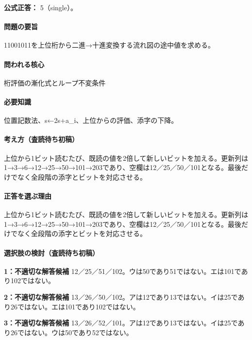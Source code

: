 \textbf{公式正答：} 5（single）。

\paragraph{問題の要旨} 11001011を上位桁から二進→十進変換する流れ図の途中値を求める。

\paragraph{問われる核心} 桁評価の漸化式とループ不変条件

\paragraph{必要知識} 位置記数法、s←2s+a\_i、上位からの評価、添字の下降。

\paragraph{考え方（査読待ち初稿）} 上位から1ビット読むたび、既読の値を2倍して新しいビットを加える。更新列は1→3→6→12→25→50→101→203であり、空欄は12／25／50／101となる。最後だけでなく全段階の添字とビットを対応させる。

\paragraph{正答を選ぶ理由} 上位から1ビット読むたび、既読の値を2倍して新しいビットを加える。更新列は1→3→6→12→25→50→101→203であり、空欄は12／25／50／101となる。最後だけでなく全段階の添字とビットを対応させる。

\paragraph{選択肢の検討（査読待ち初稿）}\mbox{}\par

\noindent\textbf{1：不適切な解答候補} 12／25／51／102。ウは50であり51ではない。エは101であり102ではない。\par

\noindent\textbf{2：不適切な解答候補} 13／26／50／102。アは12であり13ではない。イは25であり26ではない。エは101であり102ではない。\par

\noindent\textbf{3：不適切な解答候補} 13／26／52／101。アは12であり13ではない。イは25であり26ではない。ウは50であり52ではない。\par

